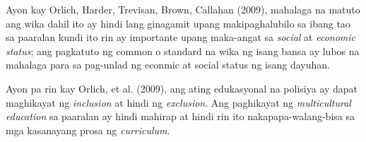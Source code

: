 \documentclass [parskip=full, 11pt] {scrreprt}
\begin{document}
Ayon kay Orlich, Harder, Trevisan, Brown, Callahan (2009), mahalaga na matuto ang
wika dahil ito ay hindi lang ginagamit upang makipaghalubilo sa ibang tao sa
paaralan kundi ito rin ay importante upang maka-angat sa \emph{social} at
\emph{economic status}; ang pagkatuto ng common o standard na wika ng isang
bansa ay lubos na mahalaga para sa pag-unlad ng econmic at social status ng
isang dayuhan.

Ayon pa rin kay Orlich, et al. (2009), ang ating edukasyonal na polisiya ay
dapat maghikayat ng \emph{inclusion} at hindi ng \emph{exclusion}. Ang
paghikayat ng \emph{multicultural education} sa paaralan ay hindi mahirap at
hindi rin ito nakapapa-walang-bisa sa mga kasanayang prosa ng \emph{curriculum}.
\end{document}

